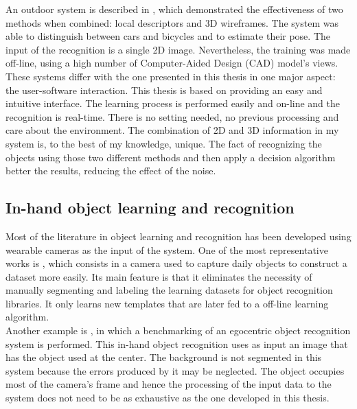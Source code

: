 An outdoor system is described in \cite{Zia2013}, which demonstrated the effectiveness of two methods when combined: local descriptors and 3D wireframes. 
The system was able to distinguish between cars and bicycles and to estimate their pose. 
The input of the recognition is a single 2D image. 
Nevertheless, the training was made off-line, using a high number of Computer-Aided Design (CAD) model's views. 
\\

These systems differ with the one presented in this thesis in one major aspect: 
the user-software interaction. 
This thesis is based on providing an easy and intuitive interface. 
The learning process is performed easily and on-line and the recognition is real-time. 
There is no setting needed, no previous processing and care about the environment. 
The combination of 2D and 3D information in my system is, to the best of my knowledge, unique. 
The fact of recognizing the objects using those two different methods and then apply a decision algorithm better the results, reducing the effect of the noise.  



\subsection{In-hand object learning and recognition}

Most of the literature in object learning and recognition has been developed using wearable cameras as the input of the system. 
One of the most representative works is \cite{Roth2006}, which consists in a camera used to capture daily objects to construct a dataset more easily. 
Its main feature is that it eliminates the necessity of manually segmenting and labeling the learning datasets for object recognition libraries. 
It only learns new templates that are later fed to a off-line learning algorithm. 
\\

Another example is \cite{Philipose2009}, in which a benchmarking of an egocentric object recognition system is performed. 
This in-hand object recognition uses as input an image that has the object used at the center. 
The background is not segmented in this system because the errors produced by it may be neglected.
The object occupies most of the camera's frame and hence the processing of the input data to the system does not need to be as exhaustive as the one developed in this thesis.  
\\

